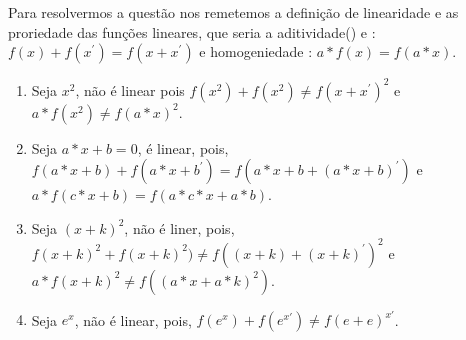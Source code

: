 \begin{resol}
        \begin{flushleft}
        Para resolvermos a questão nos remetemos a definição de linearidade e as proriedade das funções lineares,
        que seria a aditividade() e : $f(x) + f(x^{'}) = f(x + x^{'})$
        e homogeniedade : $a*f(x) = f(a*x)$.
        \end{flushleft}
        \begin{flushleft}
            \begin{enumerate}
                \item Seja $x^{2}$, não é linear pois $f(x^{2}) + f(x^{2}) \neq f(x + x^{'})^2$ e $a*f(x^{2}) \neq f(a*x)^{2}$.
                \item Seja $a*x + b = 0$, é linear, pois, $f(a*x + b) + f(a*x + b^{'}) = f(a*x + b + (a*x + b)^{'})$ e  $a*f(c*x + b) = f(a*c*x + a*b)$.
                \item Seja $(x + k)^{2}$, não é liner, pois, $f(x + k)^{2} + f(x + k)^{2}) \neq f((x + k) + (x + k)^{'})^2$
            e $a*f(x + k)^{2} \neq f((a*x + a*k)^{2})$.
                \item Seja $e^{x}$, não é linear, pois, $f(e^{x}) + f(e^{x'}) \neq f(e + e)^{x'}$.
            \end{enumerate}
        \end{flushleft}
\end{resol}
